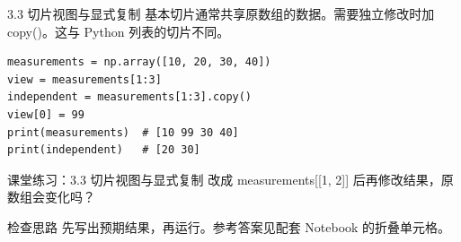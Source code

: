 \begin{frame}[fragile]{3.3 切片视图与显式复制}
\small 基本切片通常共享原数组的数据。需要独立修改时加 copy()。这与 Python 列表的切片不同。
\medskip
\begin{lstlisting}
measurements = np.array([10, 20, 30, 40])
view = measurements[1:3]
independent = measurements[1:3].copy()
view[0] = 99
print(measurements)  # [10 99 30 40]
print(independent)   # [20 30]
\end{lstlisting}
\end{frame}
\begin{frame}[fragile]{课堂练习：3.3 切片视图与显式复制}
改成 measurements[[1, 2]] 后再修改结果，原数组会变化吗？
\medskip
\begin{block}{检查思路}
先写出预期结果，再运行。参考答案见配套 Notebook 的折叠单元格。
\end{block}
\end{frame}
